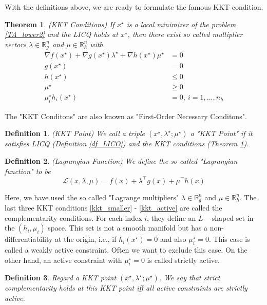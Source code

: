 \documentclass  [
  paper    = a4,
  BCOR     = 10mm,
  twoside,
  fontsize = 12pt,
  fleqn,
  toc      = bibnumbered,
  toc      = listofnumbered,
  numbers  = noendperiod,
  headings = normal,
  listof   = leveldown,
  version  = 3.03
]                                       {scrreprt}
\newcommand{\<}{\langle}
\renewcommand{\>}{\rangle}
\newtheorem{theorem}{Theorem}
\newtheorem{definition}{Definition}
\begin{document}
With the definitions above, we are ready to formulate the famous KKT condition. 
\begin{theorem}(KKT Conditions)
If $x^\star$ is a local minimizer of the problem \ref{TA_lower2} and the LICQ holds at $x^\star$, then there exist
so called multiplier vectors $\lambda \in \mathbb{R}^n_g$ and $\mu \in \mathbb{R}^n_h$ with 
   \begin{subequations}
	\begin{align}
		 \nabla f(x^\star) + \nabla g(x^\star) \lambda^\star +  \nabla h(x^\star) \mu^\star &= 0 \\
		 g(x^\star)	 &= 0   \\
	     h(x^\star)	&\leq 0  \label{kkt_smaller}\\
	     \mu^\star & \geq 0 \\
	     \mu_i^\star  h_i(x^\star) &=0 , \  i = 1, ..., n_h \label{kkt_active}
	\end{align}
\end{subequations}
\label{TH_KKT}
\end{theorem}
The "KKT Conditons" are also known as "First-Order Necessary Conditons". 

\begin{definition}(KKT Point)
We call a triple $(x^\star, \lambda^\star; \mu^\star)$ a "KKT Point" if it satisfies LICQ  (Definition \ref{df_LICO}) and the KKT conditions (Theorem \ref{TH_KKT}).
\end{definition}
\begin{definition}(Lagrangian Function)
We define the so called "Lagrangian function" to be
\begin{equation}
	\mathcal{L}(x,\lambda, \mu) = f(x) + \lambda^\top g(x) +  \mu^\top h(x) 
	\label{eq_Lagrangian}
\end{equation}
\end{definition}
Here, we have used the so called "Lagrange multipliers" $\lambda \in \mathbb{R}^n_g$ and $\mu \in \mathbb{R}^n_h$. 
The last three KKT conditions \ref{kkt_smaller} - \ref{kkt_active} are called the complementarity conditions. For each index $i$, they define an $L-$shaped set in the $(h_i, \mu_i)$ space. This set is not a smooth manifold but has a non-differentiability at the origin, i.e., if  $h_i(x^\star)=0$ and also $\mu_i^\star = 0$. This case is called a weakly active constraint. Often we want to exclude this case. On the other hand, an active constraint with $\mu_i^\star = 0$ is called strictly active.
\begin{definition}
	Regard a KKT point $(x^\star, \lambda^\star; \mu^\star)$. We say that strict complementarity holds at this KKT point iff all	active constraints are strictly active.
\end{definition}
\end{document}
